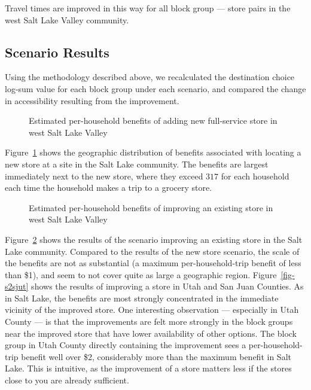 \documentclass[
  letterpaper,
  number,
  review,
  3p]{elsarticle}
\begin{document}
Travel times are improved in this way for all block group --- store
pairs in the west Salt Lake Valley community.

\subsection{Scenario Results}\label{scenario-results}

Using the methodology described above, we recalculated the destination
choice log-sum value for each block group under each scenario, and
compared the change in accessibility resulting from the improvement.

\begin{figure}


\caption{\label{fig-s1results}Estimated per-household benefits of adding
new full-service store in west Salt Lake Valley}

\end{figure}%

Figure~\ref{fig-s1results} shows the geographic distribution of benefits
associated with locating a new store at a site in the Salt Lake
community. The benefits are largest immediately next to the new store,
where they exceed \(317\) for each household each time the household
makes a trip to a grocery store.

\begin{figure}


\caption{\label{fig-s2results}Estimated per-household benefits of
improving an existing store in west Salt Lake Valley}

\end{figure}%

Figure~\ref{fig-s2results} shows the results of the scenario improving
an existing store in the Salt Lake community. Compared to the results of
the new store scenario, the scale of the benefits are not as substantial
(a maximum per-household-trip benefit of less than \$1), and seem to not
cover quite as large a geographic region. Figure~\ref{fig-s2sjut} shows
the results of improving a store in Utah and San Juan Counties. As in
Salt Lake, the benefits are most strongly concentrated in the immediate
vicinity of the improved store. One interesting observation ---
especially in Utah County --- is that the improvements are felt more
strongly in the block groups near the improved store that have lower
availability of other options. The block group in Utah County directly
containing the improvement sees a per-household-trip benefit well over
\$2, considerably more than the maximum benefit in Salt Lake. This is
intuitive, as the improvement of a store matters less if the stores
close to you are already sufficient.
\end{document}
